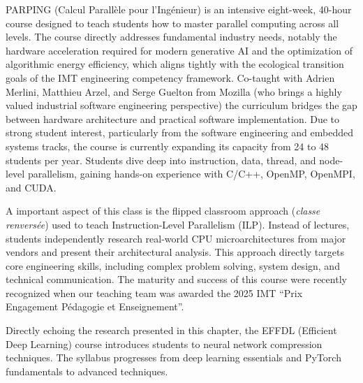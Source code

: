 \documentclass[11pt]{report}
\begin{document}
PARPING (Calcul Parallèle pour l'Ingénieur) is an intensive eight-week, 40-hour course designed to teach students how to master parallel computing across all levels. The course directly addresses fundamental industry needs, notably the hardware acceleration required for modern generative AI and the optimization of algorithmic energy efficiency, which aligns tightly with the ecological transition goals of the IMT engineering competency framework. Co-taught with Adrien Merlini, Matthieu Arzel, and Serge Guelton from Mozilla (who brings a highly valued industrial software engineering perspective) the curriculum bridges the gap between hardware architecture and practical software implementation. Due to strong student interest, particularly from the software engineering and embedded systems tracks, the course is currently expanding its capacity from 24 to 48 students per year. Students dive deep into instruction, data, thread, and node-level parallelism, gaining hands-on experience with C/C++, OpenMP, OpenMPI, and CUDA.

A important aspect of this class is the flipped classroom approach (\textit{classe renversée}) used to teach Instruction-Level Parallelism (ILP). Instead of lectures, students independently research real-world CPU microarchitectures from major vendors and present their architectural analysis. This approach directly targets core engineering skills, including complex problem solving, system design, and technical communication. The maturity and success of this course were recently recognized when our teaching team was awarded the 2025 IMT ``Prix Engagement Pédagogie et Enseignement''.

Directly echoing the research presented in this chapter, the EFFDL (Efficient Deep Learning) course introduces students to neural network compression techniques. The syllabus progresses from deep learning essentials and PyTorch fundamentals to advanced techniques.
\end{document}
